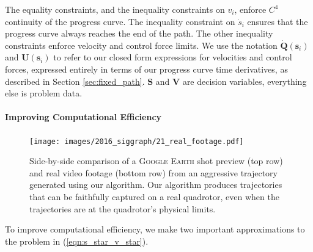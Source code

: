 The equality constraints, and the inequality constraints on $v_i$, enforce $C^4$ continuity of the progress curve.
The inequality constraint on $\dot{s}_i$ ensures that the progress curve always reaches the end of the path.
The other inequality constraints enforce velocity and control force limits.
We use the notation $\dot{\mathbf{Q}}(\mathbf{s}_i)$ and $\mathbf{U}(\mathbf{s}_i)$ to refer to our closed form expressions for velocities and control forces, expressed entirely in terms of our progress curve time derivatives, as described in Section \ref{sec:fixed_path}.
$\mathbf{S}$ and $\mathbf{V}$ are decision variables, everything else is problem data.


\paragraph{Improving Computational Efficiency}

\begin{figure}[t!]
\centering
\texttt{[image: images/2016\_siggraph/21\_real\_footage.pdf]}
\caption{
Side-by-side comparison of a \textsc{Google Earth} shot preview (top row) and real video footage (bottom row) from an aggressive trajectory generated using our algorithm.
Our algorithm produces trajectories that can be faithfully captured on a real quadrotor, even when the trajectories are at the quadrotor's physical limits.
}
\label{fig:real}
\end{figure}

To improve computational efficiency, we make two important approximations to the problem in (\ref{eqn:s_star_v_star}).


